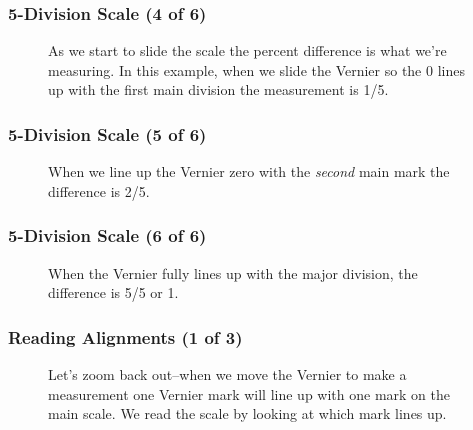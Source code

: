 \begin{frame}
	\frametitle{5-Division Scale (4 of 6)}

    \begin{figure}
        \centering
        \resizebox{0.5\columnwidth}{!}{
            
            }
        
        \vspace{0.5em}
        {\footnotesize As we start to slide the scale the percent difference is what we're measuring. In this example, when we slide the Vernier so the 0 lines up with the first main division the measurement is 1/5.\par}
    \end{figure}  
\end{frame}

\begin{frame}
	\frametitle{5-Division Scale (5 of 6)}

    \begin{figure}
        \centering
        \resizebox{0.5\columnwidth}{!}{
            
            }
        
        \vspace{0.5em}
        {\footnotesize When we line up the Vernier zero with the \emph{second} main mark the difference is 2/5.\par}
    \end{figure}  
\end{frame}

\begin{frame}
	\frametitle{5-Division Scale (6 of 6)}

    \begin{figure}
        \centering
        \resizebox{0.75\columnwidth}{!}{
            
            }
        
        \vspace{0.5em}
        {\footnotesize When the Vernier fully lines up with the major division, the difference is 5/5 or 1.\par}
    \end{figure}  
\end{frame}

\begin{frame}
	\frametitle{Reading Alignments (1 of 3)}

    \begin{figure}
        \centering
        \resizebox{0.5\columnwidth}{!}{
            
            }
        
        \vspace{0.5em}
        {\footnotesize Let's zoom back out--when we move the Vernier to make a measurement one Vernier mark will line up with one mark on the main scale. We read the scale by looking at which mark lines up.\par}
    \end{figure}   
\end{frame}

